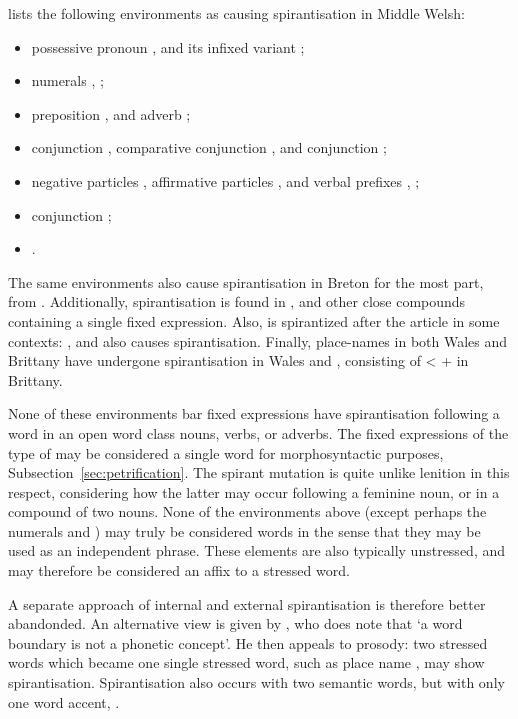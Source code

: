 \Textcite[§~24]{evans_grammar_1964} lists the following environments as causing spirantisation in  Middle Welsh:
\begin{itemize}
\item possessive pronoun , and its infixed variant ;
\item numerals , ;
\item preposition , and adverb ;
\item conjunction , comparative conjunction , and conjunction ;
\item negative particles , affirmative particles , and verbal prefixes , \etc;
\item conjunction ;
\item {}.
\end{itemize}
The same environments also cause spirantisation in Breton for the most part, \eg {} from .
Additionally,  spirantisation is found in , and other close compounds containing a single fixed expression.
Also,  is spirantized after the article in some contexts: , and  also causes spirantisation.
Finally, place-names in both Wales and Brittany have undergone spirantisation \eg {} in Wales and , consisting of  <  +  in Brittany.

None of these environments bar fixed expressions have spirantisation following a word in an open word class \ie nouns, verbs, or adverbs.
The fixed expressions of the type of  may be considered a single word for morphosyntactic purposes, \cf Subsection~\ref{sec:petrification}.
The spirant mutation is quite unlike lenition in this respect, considering how the latter may occur \eg following a feminine noun, or in a compound of two nouns. None of the environments above (except perhaps the numerals  and ) may truly be considered words in the sense that they may be used as an independent phrase.
These elements are also typically unstressed, and may therefore be considered an affix to a stressed word.

A separate approach of internal and external spirantisation is therefore better abandonded. An alternative view is given by \textcite[126--129]{koch_neo-brittonic_1989}, who does note that `a word boundary is not a phonetic concept'.
He then appeals to prosody: two stressed words which became one single stressed word, such as place name , may show spirantisation.
Spirantisation also occurs with two semantic words, but with only one word accent, \eg {}.

